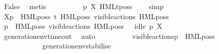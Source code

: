 \begin{isabellebody}
\ False\ \isamarkupfalse%
\ metis\isanewline
\ \ \ \ \ \ \ \ \isamarkupfalse%
\ {\isacartoucheopen}p\ {\isasymTTurnstile}{\isacharbrackleft}{\kern0pt}X{\isacharbrackright}{\kern0pt}\ HMLt{\isacharunderscore}{\kern0pt}poss\ {\isasymalpha}\ {\isasymphi}{\isacartoucheclose}\ \isamarkupfalse%
\ simp\isanewline
\ \ \ \ \ \ \isamarkupfalse%
\isanewline
\ \ \ \ \ \ \ \ \isamarkupfalse%
\ {\isacartoucheopen}{\isasymtheta}{\isacharbrackleft}{\kern0pt}X{\isacharbrackright}{\kern0pt}{\isacharparenleft}{\kern0pt}p{\isacharparenright}{\kern0pt}\ {\isasymTurnstile}\ HML{\isacharunderscore}{\kern0pt}poss\ t{\isacharunderscore}{\kern0pt}{\isasymepsilon}\ {\isacharparenleft}{\kern0pt}HML{\isacharunderscore}{\kern0pt}poss\ {\isacharparenleft}{\kern0pt}{\isasymepsilon}{\isacharbrackleft}{\kern0pt}visible{\isacharunderscore}{\kern0pt}actions{\isacharbrackright}{\kern0pt}{\isacharparenright}{\kern0pt}\ {\isacharparenleft}{\kern0pt}HML{\isacharunderscore}{\kern0pt}poss\ {\isasymalpha}\ {\isasymsigma}{\isacharparenleft}{\kern0pt}{\isasymphi}{\isacharparenright}{\kern0pt}{\isacharparenright}{\kern0pt}{\isacharparenright}{\kern0pt}{\isacartoucheclose}\isanewline
\ \ \ \ \ \ \ \ \isamarkupfalse%
\ {\isacartoucheopen}{\isasymtheta}{\isacharparenleft}{\kern0pt}p{\isacharparenright}{\kern0pt}\ {\isasymTurnstile}\ HML{\isacharunderscore}{\kern0pt}poss\ {\isacharparenleft}{\kern0pt}{\isasymepsilon}{\isacharbrackleft}{\kern0pt}visible{\isacharunderscore}{\kern0pt}actions{\isacharbrackright}{\kern0pt}{\isacharparenright}{\kern0pt}\ {\isacharparenleft}{\kern0pt}HML{\isacharunderscore}{\kern0pt}poss\ {\isasymalpha}\ {\isasymsigma}{\isacharparenleft}{\kern0pt}{\isasymphi}{\isacharparenright}{\kern0pt}{\isacharparenright}{\kern0pt}{\isacartoucheclose}\ {\isacartoucheopen}idle\ p\ X{\isacartoucheclose}\isanewline
\ \ \ \ \ \ \ \ \ \ \isamarkupfalse%
\ generation{\isacharunderscore}{\kern0pt}env{\isacharunderscore}{\kern0pt}timeout\ \isamarkupfalse%
\ auto\isanewline
\ \ \ \ \ \ \ \ \isamarkupfalse%
\ {\isacartoucheopen}{\isasymtheta}{\isacharbrackleft}{\kern0pt}visible{\isacharunderscore}{\kern0pt}actions{\isacharbrackright}{\kern0pt}{\isacharparenleft}{\kern0pt}p{\isacharparenright}{\kern0pt}\ {\isasymTurnstile}\ HML{\isacharunderscore}{\kern0pt}poss\ {\isasymalpha}\ {\isasymsigma}{\isacharparenleft}{\kern0pt}{\isasymphi}{\isacharparenright}{\kern0pt}{\isacartoucheclose}\isanewline
\ \ \ \ \ \ \ \ \ \ \isamarkupfalse%
\ generation{\isacharunderscore}{\kern0pt}env{\isacharunderscore}{\kern0pt}stabilise\ \isamarkupfalse%

\end{isabellebody}
